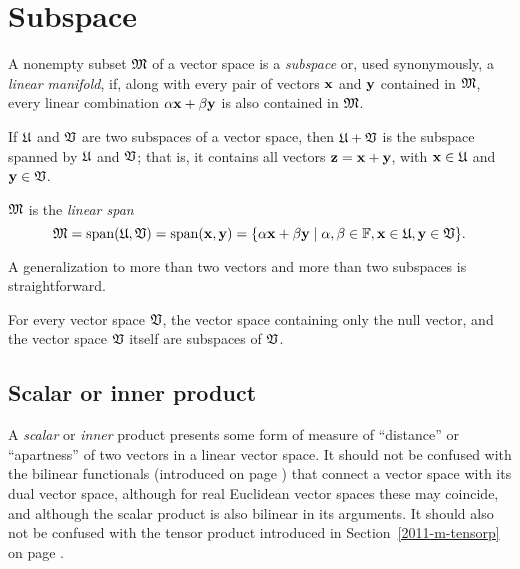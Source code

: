\section{Subspace}
\label{2011-m-subspace}
A nonempty subset ${\frak M}$ of a vector space is a {\em subspace}
or, used synonymously,
a {\em linear manifold},
 if, along with every pair of vectors ${\bf x}$   and  ${\bf y}$
 contained in  ${\frak M}$,
 every linear combination
$\alpha {\bf x} + \beta {\bf y}$ is also contained in  ${\frak M}$.

If
${\frak U}$
and
${\frak V}$
are two subspaces of a vector space,
then
${\frak U}+{\frak V}$
is the subspace spanned by
${\frak U}$
and
${\frak V}$;
that is,
it contains all vectors
${\bf z}={\bf x}+{\bf y}$, with
${\bf x}\in {\frak U}$  and
${\bf y}\in {\frak V}$.

${\frak M}$ is the {\em linear span}
\begin{equation}
{\frak M}
= \textrm{span}({\frak U},{\frak V})
= \textrm{span}({\bf x},{\bf y}) =
\{\alpha {\bf x} +\beta {\bf y}\mid \alpha ,\beta \in {\Bbb F}, {\bf x} \in {\frak U},
{\bf y} \in {\frak V}\}.
\end{equation}


A generalization to more than two vectors and more than two subspaces is straightforward.


For every vector space ${\frak V}$, the vector space containing only the null vector,
 and the vector space ${\frak V}$ itself are subspaces of ${\frak V}$.

\subsection{Scalar or inner product}
\label{2011-m-scalarproduct}

A {\em scalar} or {\em inner} product presents some form of measure of ``distance'' or ``apartness''
of two vectors in a linear vector space.
It should not be confused with the bilinear functionals (introduced on page \pageref{2011-m-dvs}) that connect a vector space with its dual vector space,
although for real Euclidean vector spaces these may coincide,
and although the scalar product is also bilinear in its arguments.
It should also not be confused with the tensor product introduced in Section~\ref{2011-m-tensorp} on page \pageref{2011-m-tensorp}.

